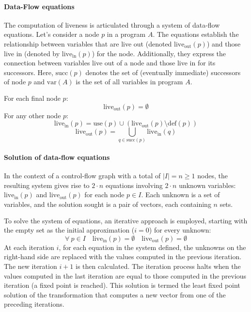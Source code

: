 \paragraph*{Data-Flow equations}
The computation of liveness is articulated through a system of data-flow equations. 
Let's consider a node $p$ in a program $A$.
The equations establish the relationship between variables that are live out (denoted $\text{live}_\text{out}\left( p \right)$) and those live in (denoted by $\text{live}_\text{in}\left( p \right)$) for the node. 
Additionally, they express the connection between variables live out of a node and those live in for its successors.
Here, $\text{succ}\left( p \right)$ denotes the set of (eventually immediate) successors of node $p$ and $\text{var}(A)$ is the set of all variables in program $A$.
\begin{definition}
      For each final node $p$:
      \[ \text{live}_\text{out}\left( p \right) = \emptyset \]
      For any other node $p$:
      \[ \text{live}_\text{in}\left( p \right) = \text{use}\left( p \right) \cup \left( \text{live}_\text{out} \left( p \right) \setminus \text{def}\left( p \right) \right) \]
      \[ \text{live}_\text{out}\left( p \right) = \bigcup_{q \in \text{succ}\left( p \right)} \text{live}_\text{in}\left( q \right) \]
\end{definition}

\paragraph*{Solution of data-flow equations}
In the context of a control-flow graph with a total of $|I| = n \geq 1$ nodes, the resulting system gives rise to $2 \cdot n$ equations involving $2 \cdot n$ unknown variables: $\text{live}_\text{in}\left( p \right)$ and $\text{live}_\text{out}\left( p \right)$ for each node $p \in I$.
Each unknown is a set of variables, and the solution sought is a pair of vectors, each containing $n$ sets.

To solve the system of equations, an iterative approach is employed, starting with the empty set as the initial approximation ($i=0$) for every unknown:
\[ \forall \: p \in I \quad \text{live}_\text{in}\left( p \right) = \emptyset \quad \text{live}_\text{out} \left( p \right) = \emptyset \]
At each iteration $i$, for each equation in the system defined, the unknowns on the right-hand side are replaced with the values computed in the previous iteration.
The new iteration $i + 1$ is then calculated.
The iteration process halts when the values computed in the last iteration are equal to those computed in the previous iteration (a fixed point is reached). 
This solution is termed the least fixed point solution of the transformation that computes a new vector from one of the preceding iterations.

